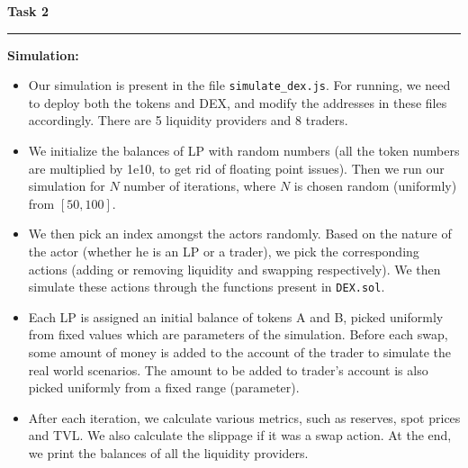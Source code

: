 \documentclass[a4paper]{article}
\newenvironment{solution}[2][]{%
\begin{mdframed}[linecolor=blue!70!black, linewidth=2pt, roundcorner=10pt, backgroundcolor=yellow!10!white, skipabove=12pt, skipbelow=12pt]%
	\textbf{\large #2}
	\par\noindent\rule{\textwidth}{0.4pt}
}{
\end{mdframed}
}
\begin{document}
\begin{solution}{Task 2}
	\textbf{Simulation:}
	\begin{itemize}
		\item Our simulation is present in the file \texttt{simulate\_dex.js}. For running, we need to deploy both the tokens and DEX, and modify the addresses in these files accordingly. There are 5 liquidity providers and 8 traders.
		\item We initialize the balances of LP with random numbers (all the token numbers are multiplied by 1e10, to get rid of floating point issues). Then we run our simulation for $N$ number of iterations, where $N$ is chosen random (uniformly) from $[50, 100]$.
		\item We then pick an index amongst the actors randomly. Based on the nature of the actor (whether he is an LP or a trader), we pick the corresponding actions (adding or removing liquidity and swapping respectively). We then simulate these actions through the functions present in \texttt{DEX.sol}.
		\item Each LP is assigned an initial balance of tokens A and B, picked uniformly from fixed values which are parameters of the simulation. Before each swap, some amount of money is added to the account of the trader to simulate the real world scenarios. The amount to be added to trader's account is also picked uniformly from a fixed range (parameter). 
		\item After each iteration, we calculate various metrics, such as reserves, spot prices and TVL. We also calculate the slippage if it was a swap action. At the end, we print the balances of all the liquidity providers.
	\end{itemize}  	
\end{solution}
\end{document}
